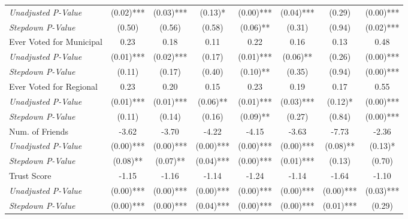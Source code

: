 \begin{tabular}{l c c c c c c c}
\quad \textit{Unadjusted P-Value} & (0.02)*** & (0.03)*** & (0.13)* & (0.00)*** & (0.04)*** & (0.29) & (0.00)*** \\
\quad \textit{Stepdown P-Value} & (0.50) & (0.56) & (0.58) & (0.06)** & (0.31) & (0.94) & (0.02)*** \\
Ever Voted for Municipal & 0.23 & 0.18 & 0.11 & 0.22 & 0.16 & 0.13 & 0.48 \\
\quad \textit{Unadjusted P-Value} & (0.01)*** & (0.02)*** & (0.17) & (0.01)*** & (0.06)** & (0.26) & (0.00)*** \\
\quad \textit{Stepdown P-Value} & (0.11) & (0.17) & (0.40) & (0.10)** & (0.35) & (0.94) & (0.00)*** \\
Ever Voted for Regional & 0.23 & 0.20 & 0.15 & 0.23 & 0.19 & 0.17 & 0.55 \\
\quad \textit{Unadjusted P-Value} & (0.01)*** & (0.01)*** & (0.06)** & (0.01)*** & (0.03)*** & (0.12)* & (0.00)*** \\
\quad \textit{Stepdown P-Value} & (0.11) & (0.14) & (0.16) & (0.09)** & (0.27) & (0.84) & (0.00)*** \\
Num. of Friends & -3.62 & -3.70 & -4.22 & -4.15 & -3.63 & -7.73 & -2.36 \\
\quad \textit{Unadjusted P-Value} & (0.00)*** & (0.00)*** & (0.00)*** & (0.00)*** & (0.00)*** & (0.08)** & (0.13)* \\
\quad \textit{Stepdown P-Value} & (0.08)** & (0.07)** & (0.04)*** & (0.00)*** & (0.01)*** & (0.13) & (0.70) \\
Trust Score & -1.15 & -1.16 & -1.14 & -1.24 & -1.14 & -1.64 & -1.10 \\
\quad \textit{Unadjusted P-Value} & (0.00)*** & (0.00)*** & (0.00)*** & (0.00)*** & (0.00)*** & (0.00)*** & (0.03)*** \\
\quad \textit{Stepdown P-Value} & (0.00)*** & (0.00)*** & (0.04)*** & (0.00)*** & (0.00)*** & (0.01)*** & (0.29) \\
\bottomrule
\end{tabular}
